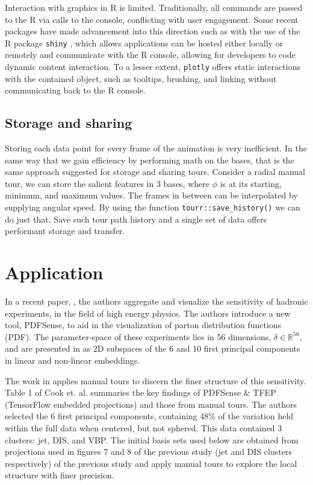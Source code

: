 \documentclass{monashthesis}
\begin{document}
Interaction with graphics in R is limited. Traditionally, all commands
are passed to the R via calls to the console, conflicting with user
engagement. Some recent packages have made advancement into this
direction such as with the use of the R package \texttt{shiny}
\autocite{chang_shiny:_2018}, which allows applications can be hosted
either locally or remotely and communicate with the R console, allowing
for developers to code dynamic content interaction. To a lesser extent,
\texttt{plotly} offers static interactions with the contained object,
such as tooltips, brushing, and linking without communicating back to
the R console.

\subsection{Storage and sharing}\label{storage-and-sharing}

Storing each data point for every frame of the animation is very
inefficient. In the same way that we gain efficiency by performing math
on the bases, that is the same approach suggested for storage and
sharing tours. Consider a radial manual tour, we can store the salient
features in 3 bases, where \(\phi\) is at its starting, minimum, and
maximum values. The frames in between can be interpolated by supplying
angular speed. By using the function \texttt{tourr::save\_history()} we
can do just that. Save such tour path history and a single set of data
offers performant storage and transfer.

\section{Application}\label{sec:application}

In a recent paper, \textcite{wang_visualizing_2018}, the authors
aggregate and visualize the sensitivity of hadronic experiments, in the
field of high energy physics. The authors introduce a new tool,
PDFSense, to aid in the visualization of parton distribution functions
(PDF). The parameter-space of these experiments lies in 56 dimensions,
\(\delta \in \mathbb{R}^{56}\), and are presented in as 2D subspaces of
the 6 and 10 first principal components in linear and non-linear
embeddings.

The work in \textcite{cook_dynamical_2018} applies manual tours to
discern the finer structure of this sensitivity. Table 1 of Cook et. al.
summaries the key findings of PDFSense \& TFEP (TensorFlow embedded
projections) and those from manual tours. The authors selected the 6
first principal components, containing 48\% of the variation held within
the full data when centered, but not sphered. This data contained 3
clusters: jet, DIS, and VBP. The initial basis sets used below are
obtained from projections used in figures 7 and 8 of the previous study
(jet and DIS clusters respectively) of the previous study and apply
manual tours to explore the local structure with finer precision.
\end{document}
